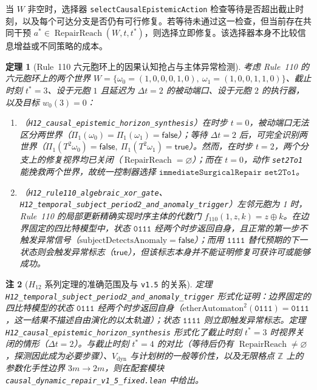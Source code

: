 \documentclass[11pt,a4paper]{article}
\theoremstyle{cleanthm}
\newtheorem{theorem}{定理}[section]
\theoremstyle{cleandef}
\newtheorem{remark}[theorem]{注}
\DeclareMathOperator{\RepairReach}{RepairReach}
\begin{document}
当 $W$ 非空时，选择器 \texttt{selectCausalEpistemicAction} 检查等待是否超出截止时刻，以及每个可达分支是否仍有可行修复。若等待未通过这一检查，但当前存在共同干预 $a^*\in\RepairReach(W,t,t^*)$，则选择立即修复。该选择器本身不比较信息增益或不同策略的成本。

\begin{theorem}[Rule~110 六元胞环上的因果认知抢占与主体异常检测]
\label{thm:h12_synthesis}
考虑 Rule~110 的六元胞环上的两个世界 $W=\{\omega_0=(1,0,0,0,1,0),\ \omega_1=(1,0,0,1,1,0)\}$、截止时刻 $t^*=3$、设于元胞 $1$ 且延迟为 $\Delta t=2$ 的被动端口、设于元胞 $2$ 的执行器，以及目标 $w_0(3)=0$：
\begin{enumerate}
  \item （\texttt{H12\_causal\_\allowbreak epistemic\_\allowbreak horizon\_\allowbreak synthesis}）在时步 $t=0$，被动端口无法区分两世界（$\Pi_1(\omega_0)=\Pi_1(\omega_1)=\mathsf{false}$）；等待 $\Delta t=2$ 后，可完全识别两世界（$\Pi_1(T^2\omega_0)=\mathsf{false},\ \Pi_1(T^2\omega_1)=\mathsf{true}$）。然而，在时步 $t=2$，两个分支上的修复视界均已关闭（$\RepairReach=\varnothing$）；而在 $t=0$，动作 \texttt{set2To1} 能挽救两个世界，故统一控制器选择 $\texttt{immediateSurgicalRepair\ set2To1}$。
  \item （\texttt{H12\_rule110\_\allowbreak algebraic\_\allowbreak xor\_\allowbreak gate}、\texttt{H12\_temporal\_\allowbreak subject\_\allowbreak period2\_\allowbreak and\_\allowbreak anomaly\_\allowbreak trigger}）左邻元胞为 1 时，Rule~110 的局部更新精确实现时序主体的代数门 $f_{110}(1,z,k)=z\oplus k$。在边界固定的四比特模型中，状态 $\mathtt{0111}$ 经两个时步返回自身，且正常的第一步不触发异常信号（$\mathrm{subjectDetectsAnomaly}=\mathsf{false}$）；而用 $\mathtt{1111}$ 替代预期的下一状态则会触发异常标志（$\mathsf{true}$），但该标志本身并不能证明修复可获许可或能够成功。
\end{enumerate}
\end{theorem}

\begin{remark}[$H_{12}$ 系列定理的准确范围及与 \texttt{v1.5} 的关系]
\label{rem:h12_scope}
定理 \texttt{H12\_temporal\_\allowbreak subject\_\allowbreak period2\_\allowbreak and\_\allowbreak anomaly\_\allowbreak trigger} 形式化证明：边界固定的四比特模型的状态 $\mathtt{0111}$ 经两个时步返回自身（$\mathrm{etherAutomaton}^2(\mathtt{0111})=\mathtt{0111}$，这一结果不描述自由演化的以太轨道）；状态 $\mathtt{1111}$ 则立即触发异常标志。定理 \texttt{H12\_causal\_\allowbreak epistemic\_\allowbreak horizon\_\allowbreak synthesis} 形式化了截止时刻 $t^*=3$ 时视界关闭的情形（$\Delta t=2$）。与截止时刻 $t^*=4$ 的对比（等待后仍有 $\RepairReach\neq\varnothing$，探测因此成为必要步骤）、$V_{\mathrm{dyn}}$ 与计划树的一般等价性，以及无限格点 $\mathbb{Z}$ 上的参数化手性边界 $3m\to 2m$，则在配套模块 \texttt{causal\_dynamic\_repair\_v1\_5\_fixed.lean} 中给出。
\end{remark}
\end{document}
